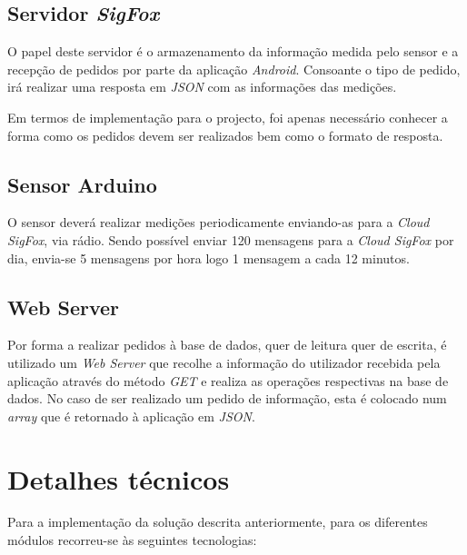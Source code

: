 \documentclass[a4paper]{article}
\begin{document}
\subsection{Servidor \textit{SigFox}}

O papel deste servidor é o armazenamento da informação medida pelo sensor e a recepção de pedidos por parte da aplicação \textit{Android}. Consoante o tipo de pedido, irá realizar uma resposta em \textit{JSON} com as informações das medições.

Em termos de implementação para o projecto, foi apenas necessário conhecer a forma como os pedidos devem ser realizados bem como o formato de resposta.

\subsection{Sensor Arduino}

O sensor deverá realizar medições periodicamente enviando-as para a \textit{Cloud SigFox}, via rádio. Sendo possível enviar 120 mensagens para a \textit{Cloud SigFox} por dia, envia-se 5 mensagens por hora logo 1 mensagem a cada 12 minutos.

\subsection{Web Server}

Por forma a realizar pedidos à base de dados, quer de leitura quer de escrita, é utilizado um \textit{Web Server} que recolhe a informação do utilizador recebida pela aplicação através do método \textit{GET} e realiza as operações respectivas na base de dados. No caso de ser realizado um pedido de informação, esta é colocado num \textit{array} que é retornado à aplicação em \textit{JSON}.

\section{Detalhes técnicos}

Para a implementação da solução descrita anteriormente, para os diferentes módulos recorreu-se às seguintes tecnologias:
\end{document}
